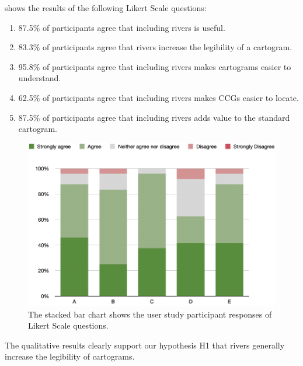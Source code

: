   shows the results of the following Likert Scale questions:
\begin{enumerate}[label=(\Alph*),align=left,leftmargin=*,labelindent=1em]
    \item 87.5\% of participants agree that including rivers is useful.
    \item 83.3\% of participants agree that rivers increase the legibility of a cartogram.
    \item 95.8\% of participants agree that including rivers makes cartograms easier to understand.
    \item 62.5\% of participants agree that including rivers makes CCGs easier to locate.
    \item 87.5\% of participants agree that including rivers adds value to the standard cartogram.
\end{enumerate}

{
\begin{figure}[tb!]
    \centering
    \includegraphics[width=\columnwidth,keepaspectratio]{figure/evaluation/likert.png}
    \caption{The stacked bar chart shows the user study participant responses of Likert Scale questions.}
    \label{fig:likert}
\end{figure}
}

The qualitative results clearly support our hypothesis H1 that rivers generally increase the legibility of cartograms.